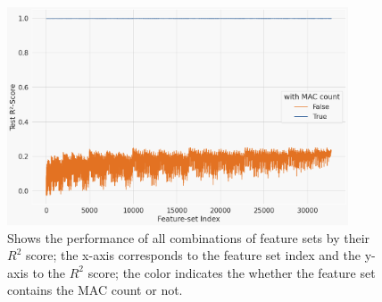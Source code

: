 \begin{figure}[t!]
    \centering
    \includegraphics[width=0.9\textwidth]{resources/ablation-analysis.png}
    \caption{Shows the performance of all combinations of feature sets by their $R^2$ score; the x-axis corresponds to the feature set index and the y-axis to the $R^2$ score; the color indicates the whether the feature set contains the MAC count or not.}
    \label{fig:ablation-analysis}
\end{figure}
